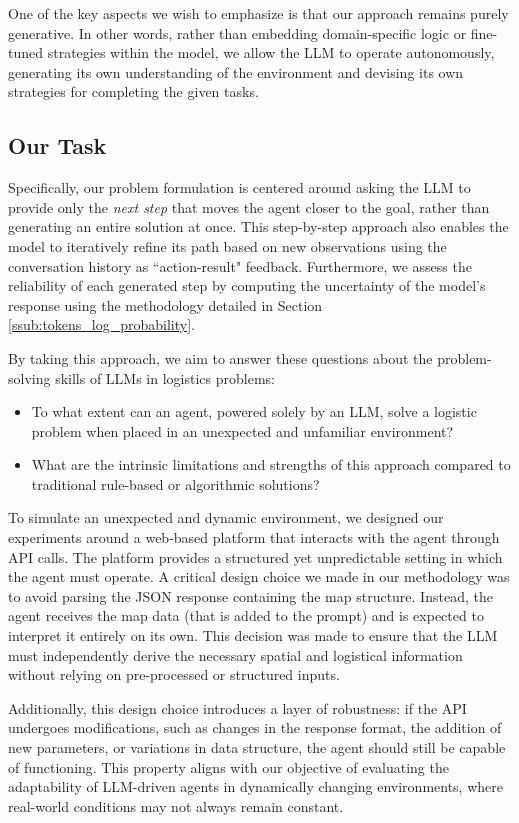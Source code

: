 One of the key aspects we wish to emphasize is that our approach remains purely
generative. In other words, rather than embedding domain-specific logic or fine-tuned
strategies within the model, we allow the LLM to operate autonomously,
generating its own understanding of the environment and devising its own
strategies for completing the given tasks.

\subsection{Our Task}
\label{sub:our_task} Specifically, our problem formulation is centered around asking
the LLM to provide only the \emph{next step} that moves the agent closer to the
goal, rather than generating an entire solution at once. This step-by-step
approach also enables the model to iteratively refine its path based on new
observations using the conversation history as ``action-result" feedback.
Furthermore, we assess the reliability of each generated step by computing the uncertainty
of the model's response using the methodology detailed in Section \ref{ssub:tokens_log_probability}.

By taking this approach, we aim to answer these questions about the problem-solving
skills of LLMs in logistics problems:
\begin{itemize}
  \item To what extent can an agent, powered solely by an LLM, solve a logistic problem
    when placed in an unexpected and unfamiliar environment?

  \item What are the intrinsic limitations and strengths of this approach compared
    to traditional rule-based or algorithmic solutions?
\end{itemize}

To simulate an unexpected and dynamic environment, we designed our experiments around
a web-based platform that interacts with the agent through API calls. The
platform provides a structured yet unpredictable setting in which the agent must
operate. A critical design choice we made in our methodology was to avoid parsing
the JSON response containing the map structure. Instead, the agent receives the map
data (that is added to the prompt) and is expected to interpret it entirely on its
own. This decision was made to ensure that the LLM must independently derive the
necessary spatial and logistical information without relying on pre-processed or
structured inputs.

Additionally, this design choice introduces a layer of robustness: if the API
undergoes modifications, such as changes in the response format, the addition of
new parameters, or variations in data structure, the agent should still be
capable of functioning. This property aligns with our objective of evaluating the
adaptability of LLM-driven agents in dynamically changing environments, where
real-world conditions may not always remain constant.

